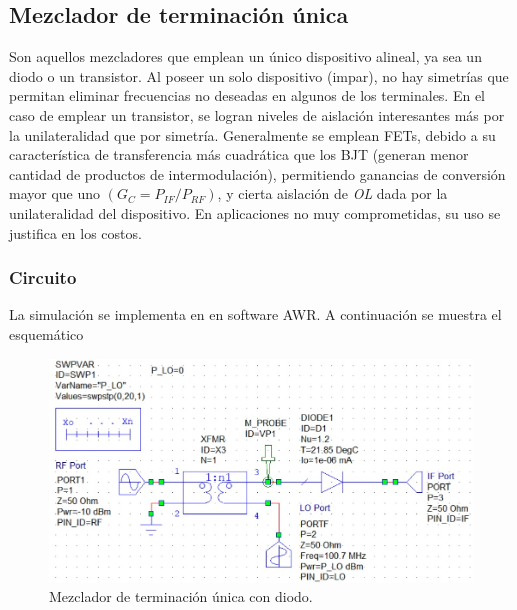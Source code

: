 \documentclass[twocolumn]{article}
\begin{document}
\subsection{Mezclador de terminación única}
Son aquellos mezcladores que emplean un único dispositivo alineal, ya sea un diodo o un transistor. Al poseer un solo dispositivo (impar), no hay simetrías que permitan eliminar frecuencias no deseadas en algunos de los terminales. En el caso de emplear un transistor, se logran niveles de aislación interesantes más por la unilateralidad que por simetría. Generalmente se emplean FETs, debido a su característica de transferencia más cuadrática que los BJT (generan menor cantidad de productos de intermodulación), permitiendo ganancias de conversión mayor que uno $(G_C = P_{IF}/P_{RF})$, y cierta aislación de \textit{OL} dada por la unilateralidad del dispositivo. En aplicaciones no muy comprometidas, su uso se justifica en los costos.

\subsubsection{Circuito}
La simulación se implementa en en software AWR. A continuación se muestra el esquemático
\begin{figure}[h]
  \centering    
	\includegraphics[width=\columnwidth]{imagenes/circuito1.jpg}
	\caption{Mezclador de terminación única con diodo.}\label{fig:fig4}
\end{figure}
\end{document}

